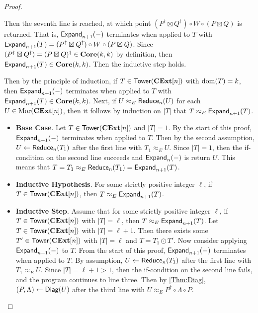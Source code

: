 \begin{proof}
\begin{itemize}
          Then the seventh line is reached, at which point $( P^\ddagger \boxtimes Q^\ddagger ) \circ W \circ ( P \boxtimes Q )$ is returned.
          That is, $\mathsf{Expand}_{n+1}( - )$ terminates when applied to $T$ with $\mathsf{Expand}_{n+1}( T ) = ( P^\ddagger \boxtimes Q^\ddagger ) \circ W \circ ( P \boxtimes Q )$.
          Since $( P^\ddagger \boxtimes Q^\ddagger ) = ( P \boxtimes Q )^\ddagger \in \mathbf{Core}( k, k )$ by definition, then $\mathsf{Expand}_{n+1}( T ) \in \mathbf{Core}( k, k )$.
          Then the inductive step holds.
    \end{itemize}
    Then by the principle of induction, if $T \in \mathsf{Tower}( \mathbf{CExt}[n] )$ with $\operatorname{dom}( T ) = k$, then $\mathsf{Expand}_{n+1}( - )$ terminates when applied to $T$ with $\mathsf{Expand}_{n+1}( T ) \in \mathbf{Core}( k, k )$.
    Next, if $U \approx_E \mathsf{Reduce}_n( U )$ for each $U \in \operatorname{Mor}( \mathbf{CExt}[n] )$, then it follows by induction on $|T|$ that $T \approx_E \mathsf{Expand}_{n+1}( T )$.
    \begin{itemize}
    \item \textbf{Base Case}.
          Let $T \in \mathsf{Tower}( \mathbf{CExt}[n] )$ and $|T| = 1$.
          By the start of this proof, $\mathsf{Expand}_{n+1}( - )$ terminates when applied to $T$.
          Then by the second assumption, $U \gets \mathsf{Reduce}_n( T_1 )$ after the first line with $T_1 \approx_E U$.
          Since $|T| = 1$, then the if-condition on the second line succeeds and $\mathsf{Expand}_n( - )$ is return $U$.
          This means that $T = T_1 \approx_E \mathsf{Reduce}_n( T_1 ) = \mathsf{Expand}_{n+1}( T )$.
    \item \textbf{Inductive Hypothesis}.
          For some strictly positive integer $\ell$, if $T \in \mathsf{Tower}( \mathbf{CExt}[n] )$, then $T \approx_E \mathsf{Expand}_{n+1}( T )$.
    \item \textbf{Inductive Step}.
          Assume that for some strictly positive integer $\ell$, if $T \in \mathsf{Tower}( \mathbf{CExt}[n] )$ with $|T| = \ell$, then $T \approx_E \mathsf{Expand}_{n+1}( T )$.
          Let $T \in \mathsf{Tower}( \mathbf{CExt}[n] )$ with $|T| = \ell + 1$.
          Then there exists some $T' \in \mathsf{Tower}( \mathbf{CExt}[n] )$ with $|T| = \ell$ and $T = T_1 \odot T'$.
          Now consider applying $\mathsf{Expand}_{n+1}( - )$ to $T$.
          From the start of this proof, $\mathsf{Expand}_{n+1}( - )$ terminates when applied to $T$.
          By assumption, $U \gets \mathsf{Reduce}_n( T_1 )$ after the first line with $T_1 \approx_E U$.
          Since $|T| = \ell + 1 > 1$, then the if-condition on the second line fails, and the program continues to line three. 
          Then by \cref{Thm:Diag}, $( P, \Lambda ) \gets \mathsf{Diag}( U )$ after the third line with $U \approx_E P^\dagger \circ \Lambda \circ P$.

\end{itemize}
\end{proof}
